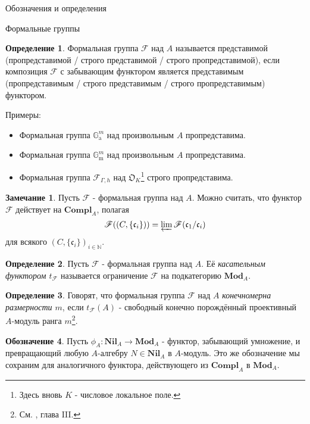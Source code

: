 \documentclass[a4paper,14pt]{extarticle}
\theoremstyle{definition}
\newtheorem{definition}{Определение}[section]
\newtheorem{denotation}[definition]{Обозначение}
\newtheorem{remark}{Замечание}[section]
\newcommand{\Compl}[1]{\mathbf{Compl}_{#1}}
\newcommand{\forget}[1]{\phi_{#1}}
\newcommand{\Mod}[1]{\mathbf{Mod}_{#1}}
\newcommand{\Nil}[1]{\mathbf{Nil}_{#1}}
\newcommand{\bG}{\mathbb{G}}
\newcommand{\bN}{\mathbb{N}}
\newcommand{\fO}{\mathfrak{O}}
\newcommand{\fc}{\mathfrak{c}}
\newcommand{\sF}{\mathscr{F}}
\newcommand{\Ga}{\bG_{\mathrm{a}}}
\newcommand{\Gm}{\bG_{\mathrm{m}}}
\begin{document}
\begin{section}{Обозначения и определения}
\begin{subsection}{Формальные группы}
\begin{definition}\label{def:3.after_formal_group:representable_formal_group}
    Формальная группа $\sF$ над $A$ называется представимой (пропредставимой / строго представимой / строго пропредставимой), если композиция $\sF$ с забывающим функтором является представимым (пропредставимым / строго представимым / строго пропредставимым) функтором.
\end{definition}

Примеры:
\begin{itemize}
    \item Формальная группа $\Ga^m$ над произвольным $A$ пропредставима.
    \item Формальная группа $\Gm^m$ над произвольным $A$ пропредставима.
    \item Формальная группа $\sF_{\Gamma, h}$ над $\fO_K$\footnote{
        Здесь вновь $K$ - числовое локальное поле.
    } строго пропредставима.
\end{itemize}

\begin{remark}\label{remark:3.2:formal_group_extension}
   Пусть $\sF$ - формальная группа над $A$. Можно считать, что функтор $\sF$ действует на $\Compl{A}$, полагая
   \begin{equation*}
       \sF((C, \{ \fc_i \})) =
       \varprojlim \sF(\fc_1 / \fc_i)
   \end{equation*}
   для всякого ${ (C, \{ \fc_i \})_{i \in \bN} }$.
\end{remark}

\begin{definition}\label{def:3.2:tangent_functor}
    Пусть $\sF$ - формальная группа над $A$. Её \textit{касательным функтором $t_\sF$} называется ограничение $\sF$ на подкатегорию $\Mod{A}$.
\end{definition}

\begin{definition}\label{def:3.3:formal_group_of_finite_dimension}
    Говорят, что формальная группа $\sF$ над $A$ \textit{конечномерна размерности $m$}, если $t_\sF(A)$ - свободный конечно порождённый проективный $A$-модуль ранга $m$\footnote{
        См. \cite{Lang}, глава III.
    }.
\end{definition}

\begin{denotation}\label{denote:3.before_lie_algebra_functor:forgetful_functor}
    Пусть ${ \forget{A} : \Nil{A} \rightarrow \Mod{A} }$ - функтор, забывающий умножение, и превращающий любую $A$-алгебру ${ N \in \Nil{A} }$ в $A$-модуль. Это же обозначение мы сохраним для аналогичного функтора, действующего из $\Compl{A}$ в $\Mod{A}$.
\end{denotation}


\end{subsection}
\end{section}
\end{document}
